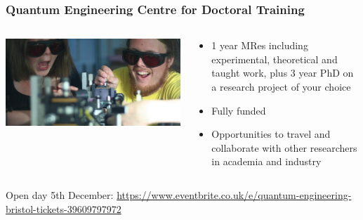 \documentclass[notes]{beamer}
\begin{document}

\begin{frame}
\frametitle{Quantum Engineering Centre for Doctoral Training}

  \begin{columns}[T]
    \begin{column}{.5\textwidth}
    \begin{center}
    \includegraphics[scale=0.2]{cdt_open_day}
    \end{center}
    \end{column}
    \begin{column}{.5\textwidth}
    \begin{itemize}
    \item 1 year MRes including experimental, theoretical and taught work, plus 3 year PhD on a research project of your choice
    
    \item Fully funded
    
    \item Opportunities to travel and collaborate with other researchers in academia and industry
    \end{itemize}
    \end{column}
  \end{columns}
  
  Open day 5th December: \url{https://www.eventbrite.co.uk/e/quantum-engineering-bristol-tickets-39609797972}

\end{frame}

\end{document}
